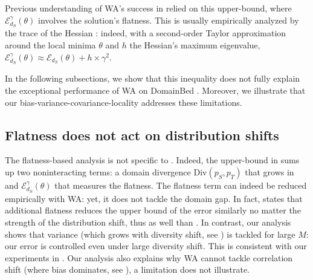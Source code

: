 Previous understanding of WA's success in \ood relied on this upper-bound, where $\mathcal{E}_{d_S}^{\gamma}(\theta)$ involves the solution's flatness.
This is usually empirically analyzed by the trace of the Hessian \cite{pmlr-v70-dinh17b,petzka2021relative,yao2020pyhessian}: indeed, with a second-order Taylor approximation around the local minima $\theta$ and $h$ the Hessian's maximum eigenvalue, $\mathcal{E}_{d_S}^{\gamma}(\theta) \approx \mathcal{E}_{d_S}(\theta) + h \times \gamma^2$.

In the following subsections, we show that this inequality does not fully explain the exceptional performance of WA on DomainBed \cite{gulrajani2021in}. Moreover, we illustrate that our bias-variance-covariance-locality addresses these limitations.
\subsection{Flatness does not act on distribution shifts}
\label{app:flatness_distribution_shifts}
The flatness-based analysis is not specific to \ood.
Indeed, the upper-bound in  sums up two noninteracting terms: a domain divergence $\mathrm{Div}(p_S,p_T)$ that grows in \ood and $\mathcal{E}_{d_S}^{\gamma}(\theta)$ that measures the \iid flatness.
The flatness term can indeed be reduced empirically with WA: yet, it does not tackle the domain gap.
In fact,  states that additional flatness reduces the upper bound of the error similarly no matter the strength of the distribution shift, thus as well \ood than \iid.
In contrast, our analysis shows that variance (which grows with diversity shift, see ) is tackled for large $M$: our error is controlled even under large diversity shift. This is consistent with our experiments in .
Our analysis also explains why WA cannot tackle correlation shift (where bias dominates, see ), a limitation \cite{cha2021wad} does not illustrate.

